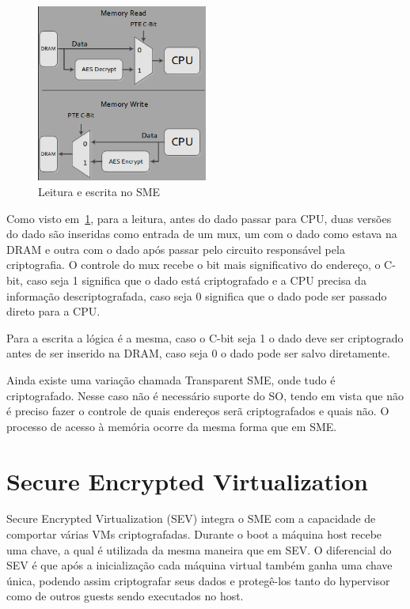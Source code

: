\documentclass{report}
\begin{document}
\begin{figure}[h]
    \centering
    \includegraphics[width=0.5\textwidth]{img/sme_read_write_architecture}
    \caption{Leitura e escrita no SME}\label{sme-read-write}
\end{figure}

Como visto em~\ref{sme-read-write}, para a leitura, antes do dado passar para
CPU, duas versões do dado são inseridas como entrada de um mux, um com o dado
como estava na DRAM e outra com o dado após passar pelo circuito responsável
pela criptografia. O controle do mux recebe o bit mais significativo do
endereço, o C-bit, caso seja 1 significa que o dado está criptografado e a CPU
precisa da informação descriptografada, caso seja 0 significa que o dado pode
ser passado direto para a CPU\@.

Para a escrita a lógica é a mesma, caso o C-bit seja 1 o dado deve ser
criptogrado antes de ser inserido na DRAM, caso seja 0 o dado pode ser salvo
diretamente.

Ainda existe uma variação chamada Transparent SME, onde tudo é criptografado.
Nesse caso não é necessário suporte do SO, tendo em vista que não é preciso
fazer o controle de quais endereços serã criptografados e quais não. O processo
de acesso à memória ocorre da mesma forma que em SME\@.


\section{Secure Encrypted Virtualization}
Secure Encrypted Virtualization (SEV) integra o SME com a capacidade de
comportar várias VMs criptografadas. Durante o boot a máquina host recebe uma
chave, a qual é utilizada da mesma maneira que em SEV. O diferencial do SEV é
que após a inicialização cada máquina virtual também ganha uma chave única,
podendo assim criptografar seus dados e protegê-los tanto do hypervisor como de
outros guests sendo executados no host.
\end{document}
